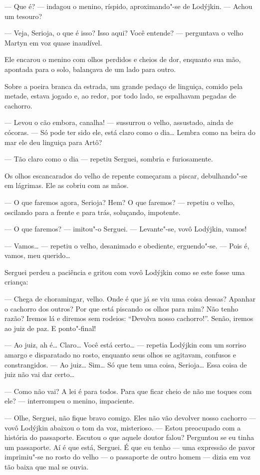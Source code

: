 --- Que é? --- indagou o menino, ríspido, aproximando"-se de Lodýjkin.
--- Achou um tesouro?

--- Veja, Serioja, o que é isso? Isso aqui? Você entende? --- perguntava
o velho Martyn em voz quase inaudível.

Ele encarou o menino com olhos perdidos e cheios de dor, enquanto sua
mão, apontada para o solo, balançava de um lado para outro.

Sobre a poeira branca da estrada, um grande pedaço de linguiça, comido
pela metade, estava jogado e, ao redor, por todo lado, se espalhavam
pegadas de cachorro.

--- Levou o cão embora, canalha! --- sussurrou o velho, assustado, ainda
de cócoras. --- Só pode ter sido ele, está claro como o dia\ldots{} Lembra
como na beira do mar ele deu linguiça para Artô?

--- Tão claro como o dia --- repetiu Serguei, sombria e furiosamente.

Os olhos escancarados do velho de repente começaram a piscar,
debulhando"-se em lágrimas. Ele as cobriu com as mãos.

--- O que faremos agora, Serioja? Hem? O que faremos? --- repetiu o
velho, oscilando para a frente e para trás, soluçando, impotente.

--- O que faremos? --- imitou"-o Serguei. --- Levante"-se, vovô Lodýjkin,
vamos!

--- Vamos\ldots{} --- repetiu o velho, desanimado e obediente, erguendo"-se.
--- Pois é, vamos, meu querido\ldots{}

Serguei perdeu a paciência e gritou com vovô Lodýjkin como se este fosse
uma criança:

--- Chega de choramingar, velho. Onde é que já se viu uma coisa dessas?
Apanhar o cachorro dos outros? Por que está piscando os olhos para mim?
Não tenho razão? Iremos lá e diremos sem rodeios: ``Devolva nosso
cachorro!''. Senão, iremos ao juiz de paz. E ponto"-final!

--- Ao juiz, ah é\ldots{} Claro\ldots{} Você está certo\ldots{} --- repetia Lodýjkin
com um sorriso amargo e disparatado no rosto, enquanto seus olhos se
agitavam, confusos e constrangidos. --- Ao juiz\ldots{} Sim\ldots{} Só que tem uma
coisa, Serioja\ldots{} Essa coisa de juiz não vai dar certo\ldots{}

--- Como não vai? A lei é para todos. Para que ficar cheio de não me
toques com ele? --- interrompeu o menino, impaciente.

--- Olhe, Serguei, não fique bravo comigo. Eles não vão devolver nosso
cachorro --- vovô Lodýjkin abaixou o tom da voz, misterioso. --- Estou
preocupado com a história do passaporte. Escutou o que aquele doutor
falou? Perguntou se eu tinha um passaporte. Aí é que está, Serguei. É
que eu tenho --- uma expressão de pavor imprimiu"-se no rosto do velho
--- o passaporte de outro homem --- dizia em voz tão baixa que mal se
ouvia.


